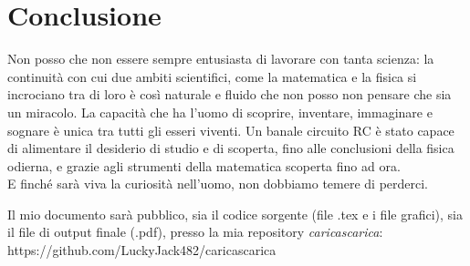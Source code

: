 \documentclass[a3paper, twoside, openany]{book}
\theoremstyle{definition}
\begin{document}
\section{Conclusione}
Non posso che non essere sempre entusiasta di lavorare con tanta scienza: la continuità con cui due ambiti scientifici, come la matematica e la fisica si incrociano tra di loro è così naturale e fluido che non posso non pensare che sia un miracolo. La capacità che ha l'uomo di scoprire, inventare, immaginare e sognare è unica tra tutti gli esseri viventi. Un banale circuito RC è stato capace di alimentare il desiderio di studio e di scoperta, fino alle conclusioni della fisica odierna, e grazie agli strumenti della matematica scoperta fino ad ora. \\ E finché sarà viva la curiosità nell'uomo, non dobbiamo temere di perderci.
\par Il mio documento sarà pubblico, sia il codice sorgente (file .tex e i file grafici), sia il file di output finale (.pdf), presso la mia repository \emph{caricascarica}: \mbox{https://github.com/LuckyJack482/caricascarica}
\end{document}

